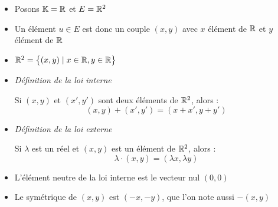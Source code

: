 \begin{frame}
\centerline{}

\begin{itemize}[<+->] 
  \item Posons $\mathbb{K}=\mathbb{R}$ et $E=\mathbb{R}^2$
  
  \item Un élément $u\in E$ est donc un
  couple $(x,y)$ avec $x$ élément de $\mathbb{R}$ et $y$ élément de $\mathbb{R}$
  
  \item $\mathbb{R}^2=\big\{(x,y)\mid x \in \mathbb{R}, y \in \mathbb{R}\big\}$
 

  \item \emph{Définition de la loi interne}
    
    Si $(x,y)$ et $(x',y')$ sont deux éléments de $\mathbb{R}^2$, alors :
  $$(x,y)+(x',y')=(x+x',y+y')$$
    
  \item \emph{Définition  de la loi externe}
    
    Si $\lambda$ est un réel et $(x,y)$ est un élément de $\mathbb{R}^2$, alors :
  $$\lambda \cdot (x,y)=(\lambda x, \lambda y)$$

  \item L'élément neutre de la loi interne est le vecteur nul $(0,0)$
  
  \item Le symétrique de $(x,y)$ est $(-x,-y)$, que l'on note aussi $-(x,y)$
  
\end{itemize} 
\end{frame}


\begin{frame}
 
\end{frame}


